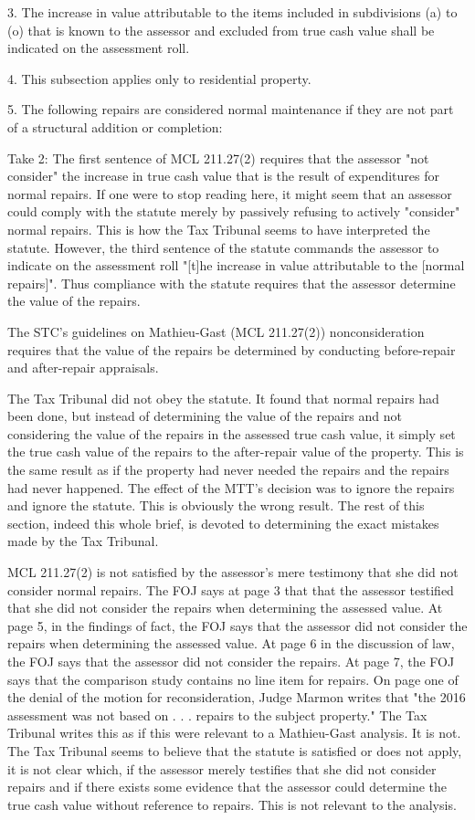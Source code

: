3. The increase in value attributable to the items included in subdivisions (a) to (o) that is known to the assessor and excluded from true cash value shall be indicated on the assessment roll. 

4. This subsection applies only to residential property. 

5. The following repairs are considered normal maintenance if they are not part of a structural addition or completion:

Take 2:
The first sentence of MCL 211.27(2) requires that the assessor "not consider" the increase in true cash value that is the result of expenditures for normal repairs. If one were to stop reading here, it might seem that an assessor could comply with the statute merely by passively refusing to actively "consider" normal repairs. This is how the Tax Tribunal seems to have interpreted the statute. However, the third sentence of the statute commands the assessor to indicate on the assessment roll "[t]he increase in value attributable to the [normal repairs]".  Thus compliance with the statute requires that the assessor determine the value of the repairs. 

The STC's guidelines on Mathieu-Gast (MCL 211.27(2)) nonconsideration requires that the value of the repairs be determined by conducting before-repair and after-repair appraisals. 

The Tax Tribunal did not obey the statute. It found that normal repairs had been done, but instead of determining the value of the repairs and not considering the value of the repairs in the assessed true cash value, it simply set the true cash value of the repairs to the after-repair value of the property. This is the same result as if the property had never needed the repairs and the repairs had never happened. The effect of the MTT's decision was to ignore the repairs and ignore the statute. This is obviously the wrong result. The rest of this section, indeed this whole brief, is devoted to determining the exact mistakes made by the Tax Tribunal. 

MCL 211.27(2) is not satisfied by the assessor's mere testimony that she did not consider normal repairs.
The FOJ says at page 3 that that the assessor testified that she did not consider the repairs when determining the assessed value. At page 5, in the findings of fact, the FOJ says that the assessor did not consider the repairs when determining the assessed value. At page 6 in the discussion of law, the FOJ says that the assessor did not consider the repairs. At page 7, the FOJ says that the comparison study contains no line item for repairs. On page one of the denial of the motion for reconsideration, Judge Marmon writes that "the 2016 assessment was not based on . . . repairs to the subject property." The Tax Tribunal writes this as if this were relevant to a Mathieu-Gast analysis. It is not. The Tax Tribunal seems to believe that the statute is satisfied or does not apply, it is not clear which, if the assessor merely testifies that she did not consider repairs and if there exists some evidence that the assessor could determine the true cash value without reference to repairs. This is not relevant to the analysis.

